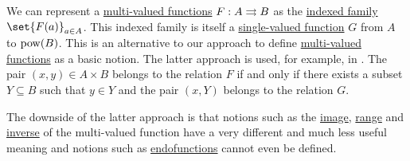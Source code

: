 \begin{remark}\label{rem:multi_valued_functions}
  We can represent a \hyperref[def:multi_valued_function]{multi-valued functions} \( F: A \rightrightarrows B \) as the \hyperref[def:cartesian_product/indexed_family]{indexed family} \( \set{ F(a) }_{a \in A} \). This indexed family is itself a \hyperref[def:function]{single-valued function} \( G \) from \( A \) to \( \operatorname{pow}(B) \). This is an alternative to our approach to define \hyperref[def:multi_valued_function]{multi-valued functions} as a basic notion. The latter approach is used, for example, in \cite[def. 2.3]{Phelps1993}. The pair \( (x, y) \in A \times B \) belongs to the relation \( F \) if and only if there exists a subset \( Y \subseteq B \) such that \( y \in Y \) and the pair \( (x, Y) \) belongs to the relation \( G \).

  The downside of the latter approach is that notions such as the \hyperref[def:multi_valued_function/image]{image}, \hyperref[def:multi_valued_function/range]{range} and \hyperref[def:multi_valued_function/inverse]{inverse} of the multi-valued function have a very different and much less useful meaning and notions such as \hyperref[def:multi_valued_function/endofunction]{endofunctions} cannot even be defined.
\end{remark}

